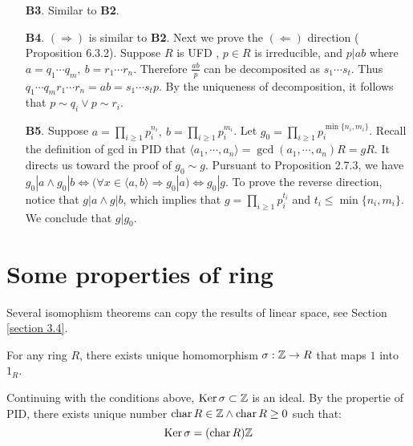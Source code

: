 \begin{enumerate}
    
    \item[\textbf{B3}.] Similar to \textbf{B2}.
    \item[\textbf{B4}.] $(\Rightarrow)$ is similar to  \textbf{B2}. Next we prove the $(\Leftarrow)$ direction (\cite{LWW_AJN} Proposition 6.3.2). Suppose $R$ is UFD , $p \in R$ is irreducible, and $p | ab$ where $a = q_1 \cdots q_m, \ b = r_1\cdots r_n$. Therefore $\frac{ab}{p}$ can be decomposited as $s_1 \cdots s_t$. Thus $q_1 \cdots q_m r_1\cdots r_n = ab = s_1 \cdots s_t p$. By the uniqueness of decomposition, it follows that $p \sim q_i \lor p \sim r_i$. 
    \item[\textbf{B5}.] Suppose $a = \prod_{i \geq 1} p_i^{n_i}, \ b = \prod_{i\geq 1} p_i^{m_i}$. Let $g_0 = \prod_{i \geq 1} p_i^{\min\{ n_i, m_i \}}$. Recall the definition of gcd in PID that $\langle a_1 , \cdots, a_n \rangle = \gcd(a_1, \cdots, a_n) R = gR$. It directs us toward the proof of $g_0 \sim g$. Pursuant to \cite{LWW_AJN} Proposition 2.7.3, we have $g_0|a \land g_0 | b \Leftrightarrow (\forall x \in \langle a, b \rangle \Rightarrow g_0 | a ) \Leftrightarrow g_0 | g$. To prove the reverse direction, notice that $g | a \land g | b$, which implies that $g = \prod_{i\geq 1} p_i^{t_i}$ and $t_i \leq \min\{ n_i, m_i \}$. We conclude that $g | g_0$.
\end{enumerate}









\section{Some properties of ring}


Several isomophism theorems can copy the results of linear space, see Section \ref{section 3.4}.


\begin{proposition}
    \label{proposition 2.2.1}
    For any ring $R$, there exists unique homomorphism $\sigma: \mathbb Z \to R$ that maps $1$ into $1_R$.
\end{proposition}



\begin{definition}
    Continuing with the conditions above, $\operatorname{Ker} \sigma \subset \mathbb Z$ is an ideal. By the propertie of PID, there exists unique number $\operatorname{char} R \in \mathbb Z \land \operatorname{char} R \geq 0$ such that: 
    \[
        \operatorname{Ker} \sigma = (\operatorname{char} R) \mathbb Z
    \]
\end{definition}




